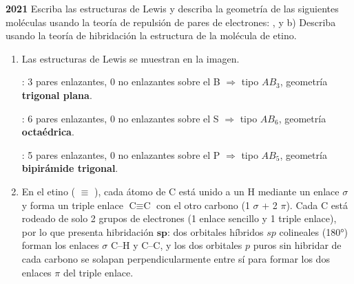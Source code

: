 \begin{exerciseEVAU}
    \textbf{2021} Escriba las estructuras de Lewis y describa la geometría de las siguientes moléculas usando la teoría de repulsión de pares de electrones: ,  y  b) Describa usando la teoría de hibridación la estructura de la molécula de etino.

    \begin{solu}


        \begin{enumerate}[label=\letraminuscula]
            \item[a)] Las estructuras de Lewis se muestran en la imagen.

            \textbf{}: 3 pares enlazantes, 0 no enlazantes sobre el B $\Rightarrow$ tipo \(AB_3\), geometría \textbf{trigonal plana}.

            \textbf{}: 6 pares enlazantes, 0 no enlazantes sobre el S $\Rightarrow$ tipo \(AB_6\), geometría \textbf{octaédrica}.

            \textbf{}: 5 pares enlazantes, 0 no enlazantes sobre el P $\Rightarrow$ tipo \(AB_5\), geometría \textbf{bipirámide trigonal}.

            \item[b)] En el etino ( \(\equiv\) ), cada átomo de C está unido a un H mediante un enlace \(\sigma\) y forma un triple enlace \(\text{C}\equiv\text{C}\) con el otro carbono (1 \(\sigma\) + 2 \(\pi\)). Cada C está rodeado de solo 2 grupos de electrones (1 enlace sencillo y 1 triple enlace), por lo que presenta hibridación \(\bm{sp}\): dos orbitales híbridos \(sp\) colineales (180°) forman los enlaces \(\sigma\) C--H y C--C, y los dos orbitales \(p\) puros sin hibridar de cada carbono se solapan perpendicularmente entre sí para formar los dos enlaces \(\pi\) del triple enlace.
        \end{enumerate}
    \end{solu}
\end{exerciseEVAU}

